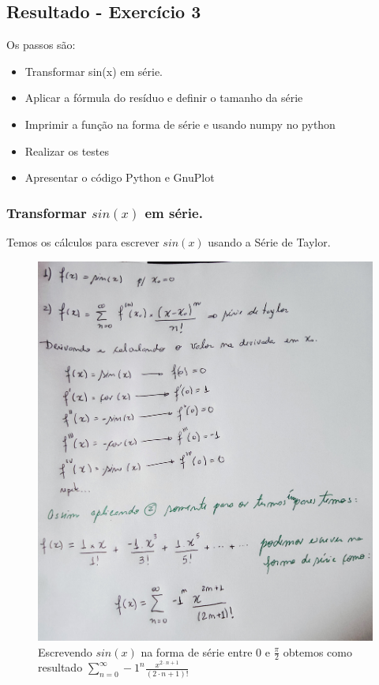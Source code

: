 \subsection{Resultado - Exercício 3}

Os passos são:
\begin{itemize}[leftmargin=3.5em, itemsep=-.5mm, topsep=0.5mm]
    \item Transformar sin(x) em série.
    \item Aplicar a fórmula do resíduo e definir o tamanho da série
    \item Imprimir a função na forma de série e usando numpy no python
    \item Realizar os testes
    \item Apresentar o código Python e GnuPlot
 \end{itemize}

\subsubsection{Transformar $sin(x)$ em série.}
Temos os cálculos para escrever $sin(x)$ usando a Série de Taylor.
\begin{figure}[H]
    \centering
    \includegraphics[width=.47\textwidth]{imagens/exercicio3_parte_1}
    \caption{Escrevendo $sin(x)$ na forma de série entre $0$ e $\frac{\pi}{2}$ obtemos como resultado $\sum_{n=0}^{\infty} -1^n \frac{x^{2 \cdot n + 1}}{(2 \cdot n + 1)!} $}
    \label{fig:lista_exercicio3_parte1}
\end{figure}
\newpage

